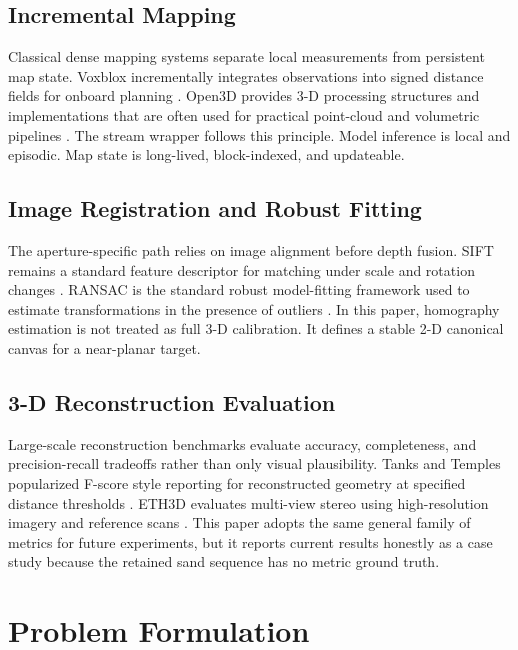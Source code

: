 \documentclass[conference]{IEEEtran}
\begin{document}
\subsection{Incremental Mapping}
Classical dense mapping systems separate local measurements from persistent map state. Voxblox incrementally integrates observations into signed distance fields for onboard planning \cite{oleynikova2017voxblox}. Open3D provides 3-D processing structures and implementations that are often used for practical point-cloud and volumetric pipelines \cite{zhou2018open3d}. The stream wrapper follows this principle. Model inference is local and episodic. Map state is long-lived, block-indexed, and updateable.

\subsection{Image Registration and Robust Fitting}
The aperture-specific path relies on image alignment before depth fusion. SIFT remains a standard feature descriptor for matching under scale and rotation changes \cite{lowe2004sift}. RANSAC is the standard robust model-fitting framework used to estimate transformations in the presence of outliers \cite{fischler1981ransac}. In this paper, homography estimation is not treated as full 3-D calibration. It defines a stable 2-D canonical canvas for a near-planar target.

\subsection{3-D Reconstruction Evaluation}
Large-scale reconstruction benchmarks evaluate accuracy, completeness, and precision-recall tradeoffs rather than only visual plausibility. Tanks and Temples popularized F-score style reporting for reconstructed geometry at specified distance thresholds \cite{knapitsch2017tanks}. ETH3D evaluates multi-view stereo using high-resolution imagery and reference scans \cite{schoeps2017eth3d}. This paper adopts the same general family of metrics for future experiments, but it reports current results honestly as a case study because the retained sand sequence has no metric ground truth.

\section{Problem Formulation}
\end{document}
